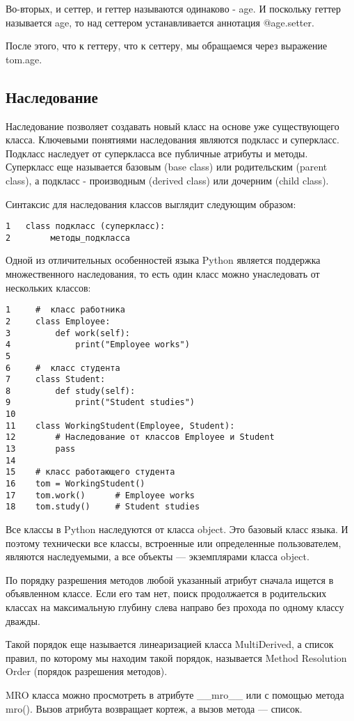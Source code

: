 \documentclass[12pt, a4paper]{article}
\begin{document}
Во-вторых, и сеттер, и геттер называются одинаково - age. И поскольку геттер называется age, то над сеттером устанавливается аннотация @age.setter.

После этого, что к геттеру, что к сеттеру, мы обращаемся через выражение tom.age.

\subsection{Наследование}

Наследование позволяет создавать новый класс на основе уже существующего класса.
Ключевыми понятиями наследования являются подкласс и суперкласс. Подкласс наследует от суперкласса все публичные атрибуты и методы. Суперкласс еще называется базовым (base class) или родительским (parent class), а подкласс - производным (derived class) или дочерним (child class).

\vspace{1em}

Синтаксис для наследования классов выглядит следующим образом:

\begin{verbatim}
1   class подкласс (суперкласс):
2        методы_подкласса
\end{verbatim}

\newpage

Одной из отличительных особенностей языка Python является поддержка множественного наследования, то есть один класс можно унаследовать от нескольких классов:

\begin{verbatim}
1     #  класс работника
2     class Employee:
3         def work(self):
4             print("Employee works")
5      
6     #  класс студента
7     class Student:
8         def study(self):
9             print("Student studies")
10     
11    class WorkingStudent(Employee, Student):        
12        # Наследование от классов Employee и Student
13        pass
14     
15    # класс работающего студента
16    tom = WorkingStudent()
17    tom.work()      # Employee works
18    tom.study()     # Student studies
\end{verbatim}

Все классы в Python наследуются от класса object. Это базовый класс языка.
И поэтому технически все классы, встроенные или определенные пользователем, являются наследуемыми, а все объекты — экземплярами класса object.

\vspace{1em}

По порядку разрешения методов любой указанный атрибут сначала ищется в объявленном классе. Если его там нет, поиск продолжается в родительских классах на максимальную глубину слева направо без прохода по одному классу дважды.

Такой порядок еще называется линеаризацией класса MultiDerived, а список правил, по которому мы находим такой порядок, называется Method Resolution Order (порядок разрешения методов).


MRO класса можно просмотреть в атрибуте \_\_mro\_\_ или с помощью метода mro(). Вызов атрибута возвращает кортеж, а вызов метода — список.
\end{document}
